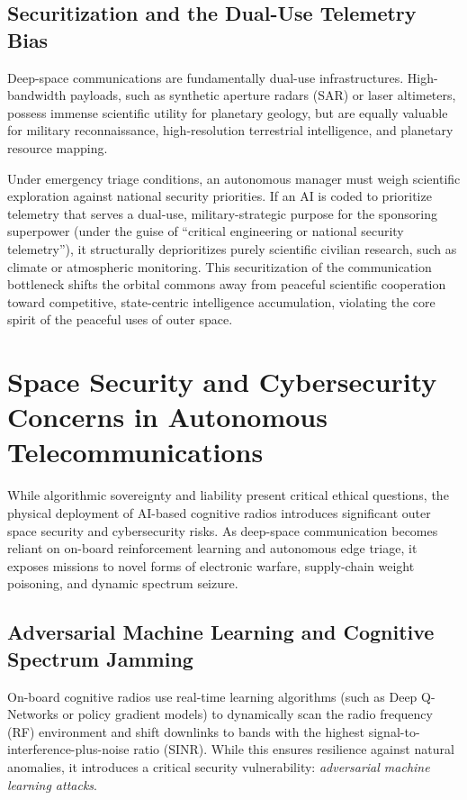 \documentclass[final,5p,times,twocolumn]{elsarticle}
\begin{document}
\subsection{Securitization and the Dual-Use Telemetry Bias}
Deep-space communications are fundamentally dual-use infrastructures. High-bandwidth payloads, such as synthetic aperture radars (SAR) or laser altimeters, possess immense scientific utility for planetary geology, but are equally valuable for military reconnaissance, high-resolution terrestrial intelligence, and planetary resource mapping. 

Under emergency triage conditions, an autonomous manager must weigh scientific exploration against national security priorities. If an AI is coded to prioritize telemetry that serves a dual-use, military-strategic purpose for the sponsoring superpower (under the guise of ``critical engineering or national security telemetry''), it structurally deprioritizes purely scientific civilian research, such as climate or atmospheric monitoring. This securitization of the communication bottleneck shifts the orbital commons away from peaceful scientific cooperation toward competitive, state-centric intelligence accumulation, violating the core spirit of the peaceful uses of outer space.

\section{Space Security and Cybersecurity Concerns in Autonomous Telecommunications}
\label{sec:security}

While algorithmic sovereignty and liability present critical ethical questions, the physical deployment of AI-based cognitive radios introduces significant outer space security and cybersecurity risks. As deep-space communication becomes reliant on on-board reinforcement learning and autonomous edge triage, it exposes missions to novel forms of electronic warfare, supply-chain weight poisoning, and dynamic spectrum seizure.

\subsection{Adversarial Machine Learning and Cognitive Spectrum Jamming}
On-board cognitive radios use real-time learning algorithms (such as Deep Q-Networks or policy gradient models) to dynamically scan the radio frequency (RF) environment and shift downlinks to bands with the highest signal-to-interference-plus-noise ratio (SINR). While this ensures resilience against natural anomalies, it introduces a critical security vulnerability: \textit{adversarial machine learning attacks}.
\end{document}
